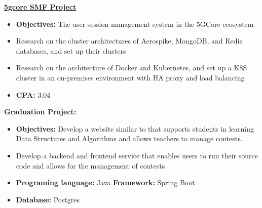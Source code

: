 \documentclass[10pt,a4paper,ragged2e,withhyper]{altacv}
\newcommand{\MYhref}[3][blue]{\href{#2}{\color{#1}{#3}}}%
\begin{document}
\begin{paracol}{2}
\divider


\large\href{https://www.tcbs.com.vn/isave}{\textbf{5gcore SMF Project}}

\begin{itemize}
\item \normalsize\textbf{Objectives:} {The user session management system in the 5GCore ecosystem}
\item \normalsize Research on the cluster architectures of Aerospike, MongoDB, and Redis databases, and set up their clusters
\item \normalsize Research on the architecture of Docker and Kubernetes, and set up a K8S cluster in an on-premises environment with HA proxy and load balancing
\end{itemize}
\vspace{0.3cm}









\switchcolumn


\begin{itemize}
\item \normalsize\textbf{CPA:} {3.04}
\end{itemize}


\large{\textbf{Graduation Project: \MYhref{https://github.com/dungbv99/mini-leetcode}{Leetcode Clone}}}

\begin{itemize}
\item \normalsize\textbf{Objectives:} {Develop a website similar to \MYhref{https://leetcode.com/problemset/all/} {Leetcode} that supports students in learning Data Structures and Algorithms and allows teachers to manage contests.}
\item Develop a backend and frontend service that enables users to run their source code and allows for the management of contests
\item \normalsize \textbf{Programing language:} {Java}  \quad \textbf{Framework:} {Spring Boot} 
\item \normalsize \textbf{Database:} {Postgres}
\end{itemize}



\end{paracol}
\end{document}
